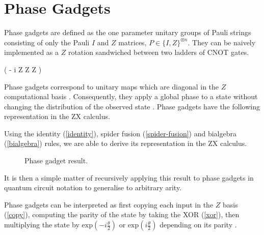 \section{Phase Gadgets}
Phase gadgets are defined as the one parameter unitary groups of Pauli strings consisting of only the Pauli $I$ and $Z$ matrices, $P \in \{I, Z\}^{\otimes n}$. They can be naively implemented as a $Z$ rotation sandwiched between two ladders of CNOT gates.

{ \left( - i  Z \otimes Z \otimes Z \right)}

Phase gadgets correspond to unitary maps which are diagonal in the $Z$ computational basis \cite{Cowtan2020}. Consequently, they apply a global phase to a state without changing the distribution of the observed state \cite{Yeung2020}. Phase gadgets have the following representation in the ZX calculus.


Using the identity (\ref{identity}), spider fusion (\ref{spider-fusion}) and bialgebra (\ref{bialgebra}) rules, we are able to derive its representation in the ZX calculus.

\begin{figure}[H]
    \centering
    \caption{Phase gadget result.}
    \label{phase-gadget-result}
\end{figure}

It is then a simple matter of recursively applying this result to phase gadgets in quantum circuit notation to generalise to arbitrary arity.

%

Phase gadgets can be interpreted as first copying each input in the $Z$ basis (\ref{copy}), computing the parity of the state by taking the XOR (\ref{xor}), then multiplying the state by $\text{exp} \left(-i\frac{\theta}{2} \right)$ or $\text{exp} \left(i\frac{\theta}{2} \right)$ depending on its parity \cite{Yeung2020}. 


